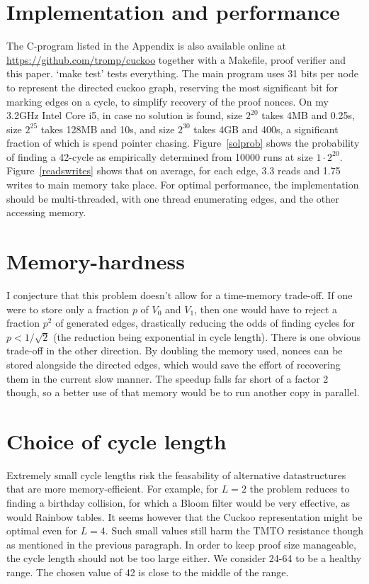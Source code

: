 \documentclass[11pt, oneside]{article}
\begin{document}
\section{Implementation and performance}
The C-program listed in the Appendix is also available online at
\url{https://github.com/tromp/cuckoo} together with a Makefile,
proof verifier and this paper. `make test' tests everything.
The main program uses 31 bits per node to represent the
directed cuckoo graph, reserving the most significant bit
for marking edges on a cycle, to simplify recovery of the proof nonces.
On my 3.2GHz Intel Core i5, in case no solution is found, size $2^{20}$ takes 4MB and 0.25s, size
$2^{25}$ takes 128MB and 10s, and size $2^{30}$ takes 4GB and 400s, a significant fraction of which
is spend pointer chasing.
Figure~\ref{solprob} shows the probability of finding a 42-cycle as empirically
determined from 10000 runs at size $1 \cdot 2^{20}$.  Figure~\ref{readswrites} shows that on average,
for each edge, 3.3 reads and 1.75 writes to main memory take place.
For optimal performance, the implementation should be multi-threaded, with one thread enumerating
edges, and the other accessing memory.

\section{Memory-hardness}
I conjecture that this problem doesn't allow for a time-memory trade-off. If
one were to store only a fraction $p$ of $V_0$ and $V_1$, then one would have
to reject a fraction $p^2$ of generated edges, drastically reducing the odds of
finding cycles for $p<1/\sqrt{2}$ (the reduction being exponential in cycle length).
There is one obvious trade-off in the other direction. By doubling the memory
used, nonces can be stored alongside the directed edges, which would save the
effort of recovering them in the current slow manner. The speedup falls far
short of a factor 2 though, so a better use of that memory would be to run
another copy in parallel.

\section{Choice of cycle length}
Extremely small cycle lengths risk the feasability of alternative datastructures that
are more memory-efficient. For example, for $L=2$ the problem reduces to finding a birthday collision,
for which a Bloom filter would be very effective, as would Rainbow tables.
It seems however that the Cuckoo representation might be optimal even for $L=4$.
Such small values still harm the TMTO resistance though as mentioned in the previous paragraph.
In order to keep proof size manageable, the cycle length should not be too large either.
We consider 24-64 to be a healthy range. The chosen value of 42 is close to the middle of the range.
\end{document}
